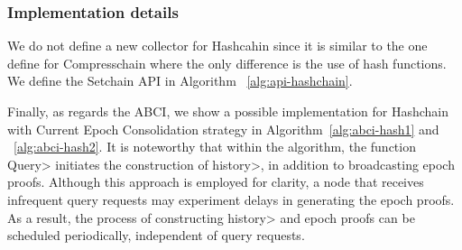 

\subsubsection{Implementation details}\label{subsubsec:details}

We do not define a new collector for Hashcahin since it is similar to the one
define for Compresschain where the only difference is the use of hash functions.
%
We define the Setchain API in Algorithm ~\ref{alg:api-hashchain}.

Finally, as regards the ABCI, we show a possible implementation for Hashchain
with Current Epoch Consolidation strategy in Algorithm~\ref{alg:abci-hash1} and ~\ref{alg:abci-hash2}. It is
noteworthy that within the algorithm, the function \<Query> initiates the construction
of \<history>, in addition to broadcasting epoch proofs. Although this approach is employed
for clarity, a node that receives infrequent query requests may experiment delays in
generating the epoch proofs. As a result, the process of constructing \<history> and
epoch proofs can be scheduled periodically, independent of query requests.



%

